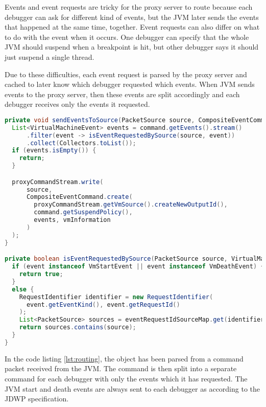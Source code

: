\documentclass[..thesis.tex]{subfiles}
\begin{document}
Events and event requests are tricky for the proxy server to route because each debugger can ask for different kind of events, but the JVM later sends the events that happened at the same time, together.
Event requests can also differ on what to do with the event when it occurs.
One debugger can specify that the whole JVM should suspend when a breakpoint is hit, but other debugger says it should just suspend a single thread.

Due to these difficulties, each event request is parsed by the proxy server and cached to later know which debugger requested which events.
When JVM sends events to the proxy server, then these events are split accordingly and each debugger receives only the events it requested.

\begin{lstlisting}[language=Java, caption={\textit{Methods for sending only the requested events to a debugger.}}, captionpos=b, label={lst:routing}]
private void sendEventsToSource(PacketSource source, CompositeEventCommand command) {
  List<VirtualMachineEvent> events = command.getEvents().stream()
      .filter(event -> isEventRequestedBySource(source, event))
      .collect(Collectors.toList());
  if (events.isEmpty()) {
    return;
  }

  proxyCommandStream.write(
      source,
      CompositeEventCommand.create(
        proxyCommandStream.getVmSource().createNewOutputId(), 
        command.getSuspendPolicy(), 
        events, vmInformation
      )
  );
}

private boolean isEventRequestedBySource(PacketSource source, VirtualMachineEvent event){
  if (event instanceof VmStartEvent || event instanceof VmDeathEvent) {
    return true;
  }
  else {
    RequestIdentifier identifier = new RequestIdentifier(
      event.getEventKind(), event.getRequestId()
    );
    List<PacketSource> sources = eventRequestIdSourceMap.get(identifier);
    return sources.contains(source);
  }
}
\end{lstlisting}

In the code listing \ref{lst:routing}, the  object has been parsed from a command packet received from the JVM.
The command is then split into a separate command for each debugger with only the events which it has requested.
The JVM start and death events are always sent to each debugger as according to the JDWP specification. \cite{oracle_jdwp_spec}
\end{document}
